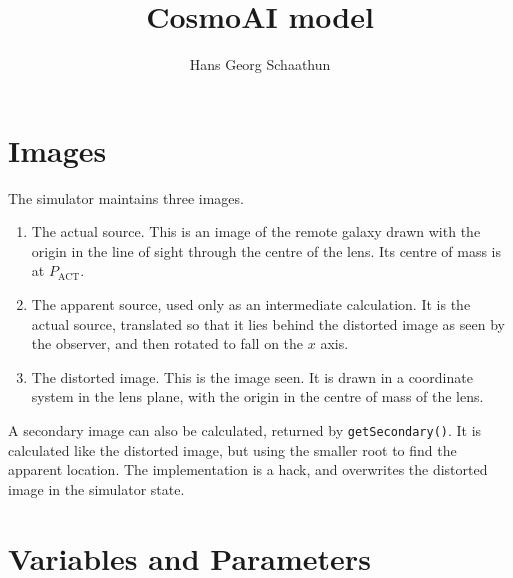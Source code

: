 \documentclass{scrartcl}
\title{CosmoAI model}
\author{Hans Georg Schaathun}
\begin{document}
\maketitle


\section{Images}

The simulator maintains three images.

\begin{enumerate}
   \item The actual source.  This is an image of the remote galaxy drawn with
      the origin in the line of sight through the centre of the lens.
      Its centre of mass is at $P_{\mathrm{ACT}}$.
   \item The apparent source, used only as an intermediate calculation.  
      It is the actual source, translated so that it lies behind the distorted
      image as seen by the observer, and then rotated to fall on the $x$ axis.
   \item The distorted image.  This is the image seen.  It is drawn in a coordinate
      system in the lens plane, with the origin in the centre of mass of the lens.
\end{enumerate}

A secondary image can also be calculated, returned by \texttt{getSecondary()}.
It is calculated like the distorted image, but using the smaller root to
find the apparent location.  The implementation is a hack, and overwrites
the distorted image in the simulator state.  


\section{Variables and Parameters}
\end{document}
